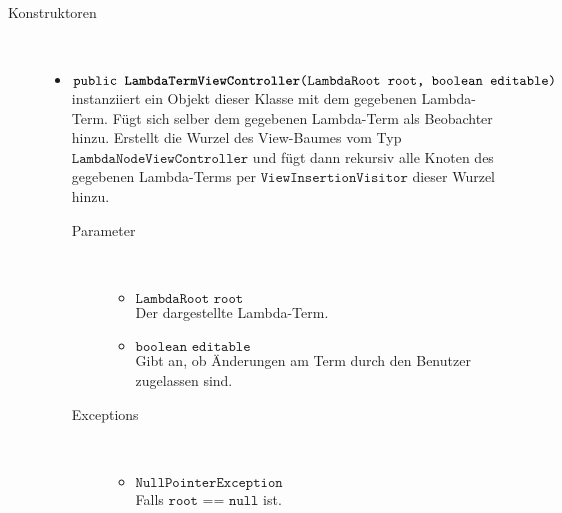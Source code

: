 \begin{description}
\item[Konstruktoren] \hfill \\
	\vspace{-.8cm}
	\begin{itemize}
		\item $\texttt{public \textbf{LambdaTermViewController}(LambdaRoot root, boolean editable)}$ \\ instanziiert ein Objekt dieser Klasse mit dem gegebenen Lambda-Term. Fügt sich selber dem gegebenen Lambda-Term als Beobachter hinzu. Erstellt die Wurzel des View-Baumes vom Typ $\texttt{LambdaNodeViewController}$ und fügt dann rekursiv alle Knoten des gegebenen Lambda-Terms per $\texttt{ViewInsertionVisitor}$ dieser Wurzel hinzu.
		\begin{description}
			\item[Parameter] \hfill \\
			\vspace{-.8cm}
			\begin{itemize}
				\item $\texttt{LambdaRoot root}$ \\ Der dargestellte Lambda-Term.
				\item $\texttt{boolean editable}$ \\ Gibt an, ob Änderungen am Term durch den Benutzer zugelassen sind.
			\end{itemize}
			\item[Exceptions] \hfill \\
			\vspace{-.8cm}
			\begin{itemize}
				\item $\texttt{NullPointerException}$ \\ Falls $\texttt{root == null}$ ist.
			\end{itemize}
		\end{description}
	\end{itemize}
	

\end{description}
